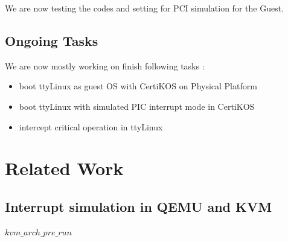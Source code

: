 \documentclass[a4paper,12pt]{article}
\begin{document}
We are now testing the codes and setting for PCI simulation for the Guest. 

\subsection{Ongoing Tasks }
We are now mostly working on finish following tasks : 
\begin{itemize}
\item boot ttyLinux as guest OS with CertiKOS on Physical Platform
\item boot ttyLinux with simulated PIC interrupt mode  in CertiKOS
\item intercept  critical operation in ttyLinux
\end{itemize}


\section{Related Work}

\subsection{Interrupt simulation in QEMU and KVM}
$kvm\_arch\_pre\_run$





\end{document}
